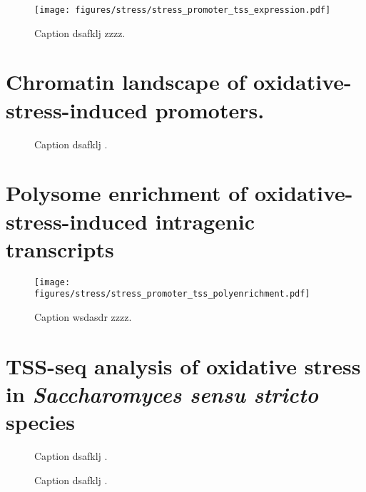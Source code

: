 \begin{figure}
\texttt{[image: figures/stress/stress\_promoter\_tss\_expression.pdf]}
\caption[TSS-seq expression levels in oxidative stress of oxidative-stress-induced genic and intragenic promoters.]{Caption dsafklj zzzz.}
\label{fig:stress_promoter_tss_diffexp_summary}
\end{figure}

\section{Chromatin landscape of oxidative-stress-induced promoters.}

\begin{figure}
\caption[A figure showing TSS-seq, TFIIB ChIP-nexus, and MNase-ChIP-seq for the oxidative-stress-induced promoters.]{Caption dsafklj .}
\end{figure}

\section{Polysome enrichment of oxidative-stress-induced intragenic transcripts}

\begin{figure}
\texttt{[image: figures/stress/stress\_promoter\_tss\_polyenrichment.pdf]}
\caption[Polysome enrichment in oxidative stress, for oxidative-stress-induced genic and intragenic promoters.]{Caption wsdasdr zzzz.}
\label{fig:stress_promoter_tss_polyenrichment}
\end{figure}

\section{TSS-seq analysis of oxidative stress in \textit{Saccharomyces sensu stricto} species}

\begin{figure}
\caption[A figure showing TSS-seq coverage over oxidative-stress-induced TSSs in the three species.]{Caption dsafklj .}
\end{figure}

\begin{figure}
\caption[A figure showing TSS-seq coverage over DSK2 in the three species, possibly with the corresponding northern blot.]{Caption dsafklj .}
\end{figure}


